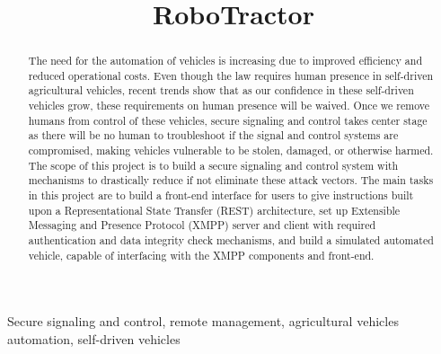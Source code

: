 \documentclass[conference,12pt]{IEEEtran}
\begin{document}
%
\title{RoboTractor}
\author{
\and
{}
\and
{}
}
\maketitle


\begin{abstract}
The need for the automation of vehicles is increasing due to improved
efficiency and reduced operational costs. Even though the law requires human
presence in self-driven agricultural vehicles, recent trends show that as
our confidence in these self-driven vehicles grow, these requirements on
human presence will be waived. Once we remove humans from control of these
vehicles, secure signaling and control takes center stage as there will be
no human to troubleshoot if the signal and control systems are compromised,
making vehicles vulnerable to be stolen, damaged, or otherwise harmed. The
scope of this project is to build a secure signaling and control system with
mechanisms to drastically reduce if not eliminate these attack vectors. The
main tasks in this project are to build a front-end interface for users to
give instructions built upon a Representational State Transfer (REST)
architecture, set up Extensible Messaging and Presence Protocol (XMPP)
server and client with required authentication and data integrity check
mechanisms, and build a simulated automated vehicle, capable of
interfacing with the XMPP components and front-end.  
\end{abstract}

\begin{IEEEkeywords}
    Secure signaling and control, remote management, agricultural vehicles automation, self-driven vehicles
\end{IEEEkeywords}
\end{document}
